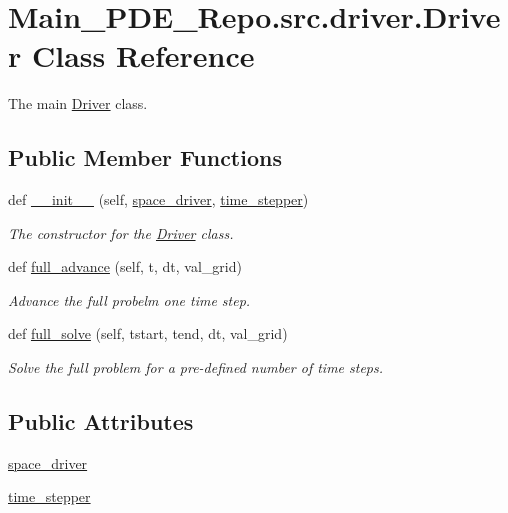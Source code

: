 \hypertarget{classMain__PDE__Repo_1_1src_1_1driver_1_1Driver}{}\section{Main\+\_\+\+P\+D\+E\+\_\+\+Repo.\+src.\+driver.\+Driver Class Reference}
\label{classMain__PDE__Repo_1_1src_1_1driver_1_1Driver}


The main \hyperlink{classMain__PDE__Repo_1_1src_1_1driver_1_1Driver}{Driver} class.  


\subsection*{Public Member Functions}
\begin{DoxyCompactItemize}
\item 
def \hyperlink{classMain__PDE__Repo_1_1src_1_1driver_1_1Driver_a3511ca3e52659cc97066122ff811693b}{\+\_\+\+\_\+init\+\_\+\+\_\+} (self, \hyperlink{classMain__PDE__Repo_1_1src_1_1driver_1_1Driver_afbceb17919398235d08dfa86fc9bd797}{space\+\_\+driver}, \hyperlink{classMain__PDE__Repo_1_1src_1_1driver_1_1Driver_ad203ab5d16ddeedc0717612a1d040b1e}{time\+\_\+stepper})
\begin{DoxyCompactList}\small\item\em The constructor for the \hyperlink{classMain__PDE__Repo_1_1src_1_1driver_1_1Driver}{Driver} class. \end{DoxyCompactList}\item 
def \hyperlink{classMain__PDE__Repo_1_1src_1_1driver_1_1Driver_a04fa6f2d8ec0bf649a21a9303e0dfdcf}{full\+\_\+advance} (self, t, dt, val\+\_\+grid)
\begin{DoxyCompactList}\small\item\em Advance the full probelm one time step. \end{DoxyCompactList}\item 
def \hyperlink{classMain__PDE__Repo_1_1src_1_1driver_1_1Driver_acaae71ffc87871c6873a1f348c7a396b}{full\+\_\+solve} (self, tstart, tend, dt, val\+\_\+grid)
\begin{DoxyCompactList}\small\item\em Solve the full problem for a pre-\/defined number of time steps. \end{DoxyCompactList}\end{DoxyCompactItemize}
\subsection*{Public Attributes}
\begin{DoxyCompactItemize}
\item 
\hyperlink{classMain__PDE__Repo_1_1src_1_1driver_1_1Driver_afbceb17919398235d08dfa86fc9bd797}{space\+\_\+driver}
\item 
\hyperlink{classMain__PDE__Repo_1_1src_1_1driver_1_1Driver_ad203ab5d16ddeedc0717612a1d040b1e}{time\+\_\+stepper}
\end{DoxyCompactItemize}


